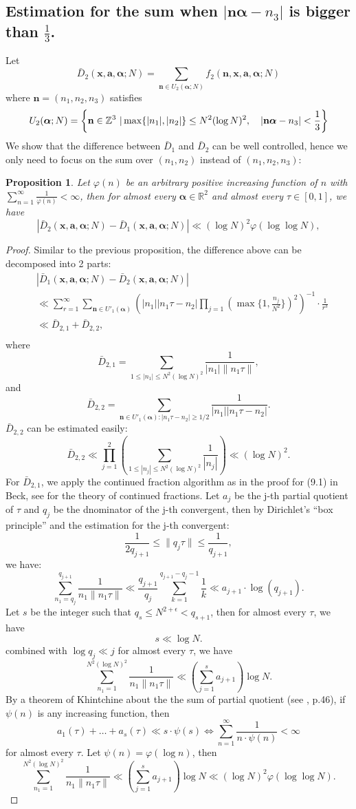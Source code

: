 \documentclass[11pt]{article}
\newtheorem{Prop}{Proposition}[section]
\newcommand{\beq}{\begin{equation}}
\newcommand{\eeq}{\end{equation}}
\newcommand{\fc}{\frac}
\renewcommand{\l}{\left}
\renewcommand{\r}{\right}
\newcommand{\Z}{\mathbb{Z}}
\newcommand{\R}{\mathbb{R}}
\renewcommand{\a}{\alpha}
\newcommand{\e}{\epsilon}
\renewcommand{\(}{\left(}
\renewcommand{\)}{\right)}
\renewcommand{\bf}{\mathbf}
\newcommand{\bal}{\begin{aligned}}
\newcommand{\eal}{\end{aligned}}
\newcommand{\n}{\bf{n}}
\newcommand{\bma}{\bm{\alpha}}
\newcommand{\ftwo}{f_2(\bf{n},\bf{x},\bm{a},\bm{\a};N)}
\newcommand{\Dtwoone}{\bar{D}_{2,1}}
\newcommand{\Dtwotwo}{\bar{D}_{2,2}}
\newcommand{\<}{\langle}
\renewcommand{\>}{\rangle}
\begin{document}
\subsection{Estimation for the sum when $|\n \bma-n_3|$ is bigger than $\fc{1}{3}$.}
Let 
$$
\bar{D}_2(\bf{x},\bm{a},\bm{\a};N)=\sum_{\bf{n}\in U_2(\bma;N)}  \ftwo
$$
where $\bf{n}=(n_1,n_2,n_3)$ satisfies
\beq{\label{bigger than one third}}
U_2(\bma;N)=
\l\{\n\in\Z^3 \ | \max\{|n_1|,|n_2|\}\le N^2(\log N)^2,\quad
|\n \bma -n_3|< \fc{1}{3}
\r\}
\eeq
We show that the difference between $\bar{D}_1$ and $\bar{D}_2$ can be well controlled, hence we only need to focus on the sum over $(n_1, n_2)$ instead of $(n_1,n_2,n_3)$:
\begin{Prop}
Let $\varphi(n)$ be an arbitrary positive increasing function of $n$ with $\sum_{n=1}^{\infty}\fc{1}{\varphi(n)}<\infty$, then for almost every $\bma \in \R^2$ and almost every $\tau\in [0,1]$, we have
$$
\l|\bar{D}_2(\bf{x},\bm{a},\bm{\a};N)-\bar{D}_1(\bf{x},\bm{a},\bm{\a};N)\r| \ll (\log N)^2\varphi(\log\log  N),
$$
\end{Prop}
\begin{proof}
Similar to the previous proposition, the difference above can be decomposed into 2 parts:
\beq\label{D2=D21+D22}
\bal
&\l|\bar{D}_1(\bf{x},\bm{a},\bm{\a};N)-\bar{D}_2(\bf{x},\bm{a},\bm{\a};N)\r|\\
&\ll \sum_{r=1}^{\infty}\sum_{\n\in U'_1(\bma)}
\l(|n_1|  |n_1\tau-n_2| \prod_{j=1}(\max\{1,\fc{n_j}{N^2}\})^2 \r)^{-1}\cdot \fc{1}{r^3}\\
&\ll\bar{D}_{2,1} +\bar{D}_{2,2},\\
\eal
\eeq
where 
$$
\Dtwoone=\sum_{1\le |n_1|\le N^2(\log N)^2} \fc{1}{|n_1| \| n_1\tau\|},
$$
and 
$$
\Dtwotwo=\sum_{\n\in U'_1(\bma): |n_1\tau-n_2|\ge 1/2} \fc{1}{|n_1||n_1\tau-n_2|}.
$$
$\Dtwotwo$ can be estimated easily:
$$
\Dtwotwo\ll \prod_{j=1}^{2}\l(\sum_{1\le |n_j|\le N^2(\log N)^2} \fc{1}{|n_j|}\r)
\ll (\log N)^2.
$$
For $\Dtwoone$, we apply the continued fraction algorithm as in the proof for (9.1) in Beck\cite{Beck}, see \cite{Lang} for the theory of continued fractions. Let $a_j$ be the j-th partial quotient of $\tau$ and $q_j$ be the dnominator of the j-th convergent, then by Dirichlet's ``box principle'' and the estimation for the j-th convergent: 
$$
\frac{1}{2q_{j+1}}\le \|q_j\tau\|\le \fc{1}{q_{j+1}},
$$
we have:
$$
\sum_{n_1=q_j}^{q_{j+1}} \frac{1}{n_1\|n_1\tau\|}\ll \frac{q_{j+1}}{q_j} \sum_{k=1}^{q_{j+1}-q_{j}-1} \frac{1}{k}\ll a_{j+1}\cdot \log (q_{j+1}).
$$
Let $s$ be the integer such that $q_s\le N^{2+\e}<q_{s+1}$, then for almost every $\tau$, we have 
$$
s\ll \log N.
$$
combined with $\log q_j\ll j$ for almost every $\tau$, we have 
$$
\sum_{n_1=1}^{N^2(\log N)^2} \fc{1}{n_1\|n_1\tau\|}\ll \l(\sum_{j=1}^{s} a_{j+1} \r) \log N.
$$
By a theorem of Khintchine about the the sum of partial quotient (see \cite{Koksma}, p.46), if $\psi(n)$ is any increasing function, then
$$
a_1(\tau)+\dots +a_s(\tau) \ll s\cdot \psi(s) \Longleftrightarrow \sum_{n=1}^{\infty} \fc{1}{n\cdot \psi(n)}<\infty
$$
for almost every $\tau$. Let $\psi(n)=\varphi(\log n)$, then 
$$
\sum_{n_1=1}^{N^2(\log N)^2} \fc{1}{n_1\|n_1\tau\|}\ll \l(\sum_{j=1}^{s} a_{j+1} \r) \log N\ll (\log N)^2\varphi(\log \log N).
$$
\end{proof}
\end{document}
